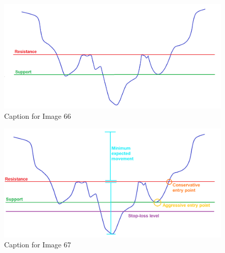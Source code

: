 \documentclass{article}
\begin{document}
\vspace{10pt}

\begin{figure}[!htb]
    \centering
    \includegraphics[width=\textwidth]{imgs/66.png}
    \caption{Caption for Image 66}
\end{figure}

\vspace{10pt}

\begin{figure}[!htb]
    \centering
    \includegraphics[width=\textwidth]{imgs/67.png}
    \caption{Caption for Image 67}
\end{figure}

\vspace{10pt}
\end{document}
